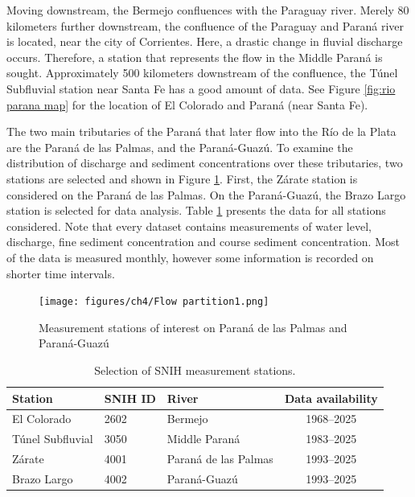 Moving downstream, the Bermejo confluences with the Paraguay river. Merely 80 kilometers further downstream, the confluence of the Paraguay and Paraná river is located, near the city of Corrientes. Here, a drastic change in fluvial discharge occurs. Therefore, a station that represents the flow in the Middle Paraná is sought. Approximately 500 kilometers downstream of the confluence, the Túnel Subfluvial station near Santa Fe has a good amount of data. See Figure \ref{fig:rio parana map} for the location of El Colorado and Paraná (near Santa Fe). 

The two main tributaries of the Paraná that later flow into the Río de la Plata are the Paraná de las Palmas, and the Paraná-Guazú. To examine the distribution of discharge and sediment concentrations over these tributaries, two stations are selected and shown in Figure \ref{fig:flow partition}. First, the Zárate station is considered on the Paraná de las Palmas. On the Paraná-Guazú, the Brazo Largo station is selected for data analysis. Table \ref{tab:stations data collection} presents the data for all stations considered. Note that every dataset contains measurements of water level, discharge, fine sediment concentration and course sediment concentration. Most of the data is measured monthly, however some information is recorded on shorter time intervals. 


\begin{figure}
    \centering
    \texttt{[image: figures/ch4/Flow partition1.png]}
    \caption{Measurement stations of interest on Paraná de las Palmas and Paraná-Guazú}
    \label{fig:flow partition}
\end{figure}



\begin{table}[H]
    \centering
    \renewcommand{\arraystretch}{1.2} %
    \setlength{\tabcolsep}{8pt}       %
    \begin{tabular}{lllc}
        \toprule
        Station & SNIH ID & River & Data availability \\
        \midrule
        El Colorado         & 2602 & Bermejo               & 1968--2025 \\
        Túnel Subfluvial    & 3050 & Middle Paraná         & 1983--2025 \\
        Zárate              & 4001 & Paraná de las Palmas  & 1993--2025 \\
        Brazo Largo         & 4002 & Paraná-Guazú          & 1993--2025 \\
        \bottomrule
    \end{tabular}
    \caption{Selection of SNIH measurement stations.}
    \label{tab:stations data collection}
\end{table}



